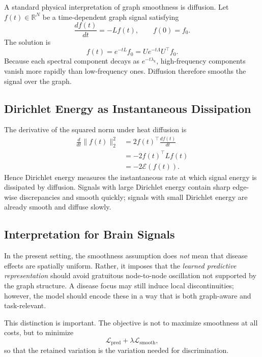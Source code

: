 A standard physical interpretation of graph smoothness is diffusion. Let \(f(t)\in\mathbb{R}^N\) be a time-dependent graph signal satisfying
\begin{equation}
\frac{d f(t)}{dt} = -L f(t), \qquad f(0)=f_0.
\end{equation}
The solution is
\begin{equation}
\label{eq:heat_solution}
f(t)=e^{-tL}f_0 = U e^{-t\Lambda} U^\top f_0.
\end{equation}
Because each spectral component decays as \(e^{-t\lambda_k}\), high-frequency components vanish more rapidly than low-frequency ones. Diffusion therefore smooths the signal over the graph.

\subsection{Dirichlet Energy as Instantaneous Dissipation}

The derivative of the squared norm under heat diffusion is
\begin{align}
\frac{d}{dt}\|f(t)\|_2^2
&=
2 f(t)^\top \frac{d f(t)}{dt}\\ %
&=
-2 f(t)^\top L f(t)\\ %
&=
-2 \mathcal{E}(f(t)).
\end{align}
Hence Dirichlet energy measures the instantaneous rate at which signal energy is dissipated by diffusion. Signals with large Dirichlet energy contain sharp edge-wise discrepancies and smooth quickly; signals with small Dirichlet energy are already smooth and diffuse slowly.

\subsection{Interpretation for Brain Signals}

In the present setting, the smoothness assumption does \emph{not} mean that disease effects are spatially uniform. Rather, it imposes that the \emph{learned predictive representation} should avoid gratuitous node-to-node oscillation not supported by the graph structure. A disease focus may still induce local discontinuities; however, the model should encode these in a way that is both graph-aware and task-relevant.

This distinction is important. The objective is not to maximize smoothness at all costs, but to minimize
\[
\mathcal{L}_{\text{pred}} + \lambda \mathcal{L}_{\text{smooth}},
\]
so that the retained variation is the variation needed for discrimination.

